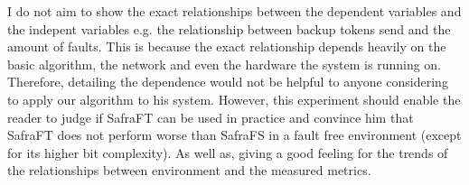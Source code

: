 I do not aim to show the exact relationships between the dependent variables and the indepent variables e.g. the relationship between backup tokens send and the amount of faults.
This is because the exact relationship depends heavily on the basic algorithm, the network and even the hardware the system is running on.
Therefore, detailing the dependence would not be helpful to anyone considering to apply our algorithm to his system.
However, this experiment should enable the reader to judge if SafraFT can be used in practice and convince him that SafraFT does not perform worse than SafraFS in a fault free environment (except for its higher bit complexity).
As well as, giving a good feeling for the trends of the relationships between environment and the measured metrics.



\begin{comment}
Hypothesis
  Safra compares to safra without signficant changes in with no failures on all network sizes
    tokens
    tokens after termination
    
      no signifcant change in token forwarding
    time ??
      no hard, complicated computations
    time after termination
      no hard, complicated computations and no change in token forwarding
  
  our Safra has higher bit complexity 
   increases linearly with network size network size of 1 == then upwards linearly

  Influence from faults
    backup tokens == number of faults - not correct
      difference caused by backup tokens / network size under same fault conditions?
      reason:  // Not to write here
        node gets to know about failing node because of token
          e.g. if its a bit further out and it gets the crashed message later
        node crash behind each other in the ring and only one backup token is send?
    Token count increases for a low level of faults as it colors nodes black and incurs in further rounds when node detects crash or when nodes gets to know of crash of successor	x
      These are mostly done during computation because CM is not processing heavy and gets passive a lot
      -> No change on tokens after termination
    Token count and time decrease for a high level of fault as network size is reduced. 
    Same for time spent
    
    Average token size grows as the crashes are propagated by the token each of them takes one round so impact on average token size depends on network size and the signficance also on number of rounds
      more noticable for many faults but than there are also less tokens also in that round
  \end{comment}
  
